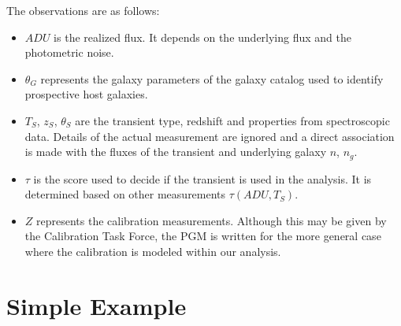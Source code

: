 \documentclass[preprint]{elsarticle}
\begin{document}
The observations are as follows:
\begin{itemize}
\item ${\mathit{ADU}}$ is the realized flux.  It depends on the underlying flux and
the photometric noise.
\item $\theta_G$ represents the galaxy parameters of the
galaxy catalog used to identify prospective host galaxies.
\item ${T}_S$, ${z}_S$, ${\theta}_S$ are the transient type, redshift and properties from
spectroscopic data. Details of the actual measurement are ignored and a direct association
is made with the fluxes of the transient and underlying galaxy $n$, $n_g$.
\item $\tau$ is the score used to decide if the transient is used in the analysis.  It is
determined based on other measurements $\tau(\mathit{ADU},T_S)$.
\item ${Z}$ represents the calibration measurements.   Although this may be given
by the Calibration Task Force, the PGM is written for the more general case where the calibration
is modeled within our analysis.
\end{itemize}


\section{Simple Example}
\end{document}

